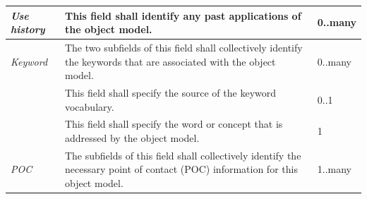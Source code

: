 \begin{tabularx}{\textwidth}{|L{0.26\textwidth}|Y|C{0.12\textwidth}|}
\textit{Use history} & This field shall identify any past applications of the object model. & 0..many \\ \hline
\textit{Keyword} & The two subfields of this field shall collectively identify the keywords that are associated with the object model. & 0..many \\ \hline
{} & This field shall specify the source of the keyword vocabulary. & 0..1 \\ \hline
{} & This field shall specify the word or concept that is addressed by the object model. & 1 \\ \hline
\textit{POC} & The subfields of this field shall collectively identify the necessary point of contact (POC) information for this object model. & 1..many \\ \hline
\end{tabularx}
\endgroup

